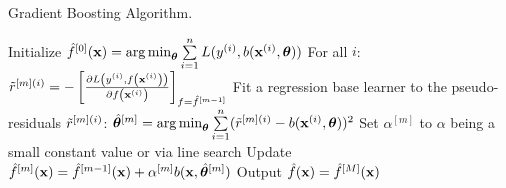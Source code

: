 \begin{algorithm}[H]
  \begin{footnotesize}
  \begin{center}
  \caption{Gradient Boosting Algorithm.}
    \begin{algorithmic}[1]
      \State Initialize $\hat{f}^{[0]}(\mathbf{x}) = \operatorname{arg\,min}_{\bm{\theta}} \sum\limits_{i=1}^n L(y^{(i)}, b(\mathbf{x}^{(i)}, \bm{\theta}))$
          \State For all $i$: $\tilde{r}^{[m](i)} = -\left[\frac{\partial{L\left(y^{(i)}, f\left(\mathbf{x}^{(i)}\right)\right)}}{\partial f\left(\mathbf{x}^{(i)}\right)}\right]_{f=\hat{f}^{[m-1]}}$
        \State Fit a regression base learner to the pseudo-residuals $\tilde{r}^{[m](i)}$:
        \State $\hat{\bm{\theta}}^{[m]} = \operatorname{arg\,min} \limits_{\bm{\theta}} \sum\limits_{i=1}^n (\tilde{r}^{[m](i)} - b(\mathbf{x}^{(i)}, \bm{\theta}))^2$
        \State Set $\alpha^{[m]}$ to $\alpha$ being a small constant value or via line search
        \State Update $\hat{f}^{[m]}(\mathbf{x}) = \hat{f}^{[m-1]}(\mathbf{x}) + \alpha^{[m]} b(\mathbf{x}, \hat{\bm{\theta}}^{[m]})$
      \EndFor
      \State Output $\hat{f}(\mathbf{x}) = \hat{f}^{[M]}(\mathbf{x})$
    \end{algorithmic}
    \end{center}
    \end{footnotesize}
\end{algorithm}
